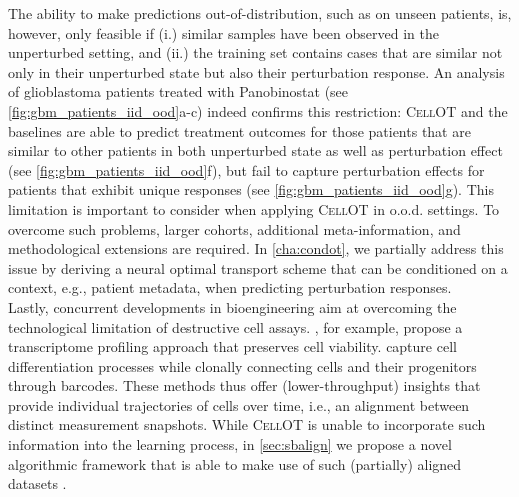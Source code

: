 The ability to make predictions out-of-distribution, such as on unseen patients, is, however, only feasible if (i.) similar samples have been observed in the unperturbed setting, and (ii.) the training set contains cases that are similar not only in their unperturbed state but also their perturbation response.
An analysis of glioblastoma patients treated with Panobinostat \citep{zhao2021deconvolution} (see \cref{fig:gbm_patients_iid_ood}a-c) indeed confirms this restriction:
\textsc{CellOT} and the baselines are able to predict treatment outcomes for those patients that are similar to other patients in both unperturbed state as well as perturbation effect (see \cref{fig:gbm_patients_iid_ood}f), but fail to capture perturbation effects for patients that exhibit unique responses (see \cref{fig:gbm_patients_iid_ood}g).
This limitation is important to consider when applying \textsc{CellOT} in o.o.d. settings. To overcome such problems, 
larger cohorts, additional meta-information, and methodological extensions are required. In \cref{cha:condot}, we partially address this issue by deriving a neural optimal transport scheme that can be conditioned on a context, e.g., patient metadata, when predicting perturbation responses. \\

Lastly, concurrent developments in bioengineering aim at overcoming the technological limitation of destructive cell assays. \citet{chen2022live}, for example, propose a transcriptome profiling approach that preserves cell viability. \citet{weinreb2020lineage} capture cell differentiation processes while clonally connecting cells and their progenitors through barcodes. These methods thus offer (lower-throughput) insights that provide individual trajectories of cells over time, i.e., an alignment between distinct measurement snapshots.
While \textsc{CellOT} is unable to incorporate such information into the learning process, in \cref{sec:sbalign} we propose a novel algorithmic framework that is able to make use of such (partially) aligned datasets \citep{shi2023diffusion, tong2023conditional, somnath2023aligned, liu2023image}. 
